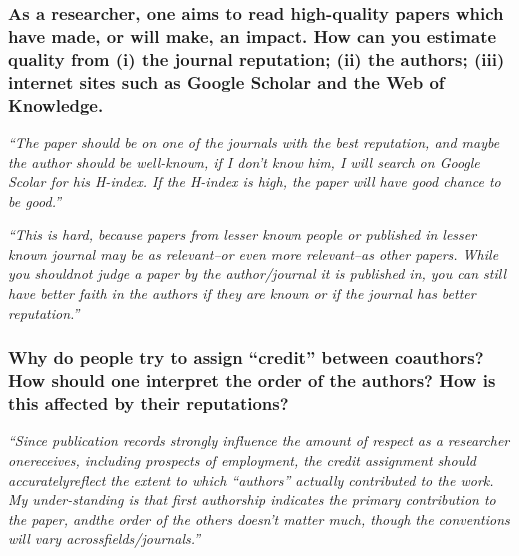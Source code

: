 \documentclass[12pt]{beamer}
\newcommand\ans[1]{{\it ``#1''}}
\begin{document}
\begin{frame} %
  \frametitle{As a researcher, one aims to read high-quality papers which have made, or will make, an impact. How can you estimate quality from (i) the journal reputation; (ii) the authors; (iii) internet sites such as Google Scholar and the Web of Knowledge.}


 \ans{The paper should be on one of the journals with the best reputation, and maybe the author should be well-known, if I don’t know him, I will search on Google Scolar for his H-index.  If the H-index is high, the paper will have good chance to be good.}

 \ans{This is hard,  because papers from lesser known people or published in lesser known journal may be as relevant--or even more relevant--as other papers.  While you shouldnot judge a paper by the author/journal it is published in, you can still have better faith in the authors if they are known or if the journal has better reputation.}
 





%
%


\end{frame} \begin{frame} %
  \frametitle{Why do people try to assign ``credit'' between coauthors? How should one interpret the order of the authors? How is this affected by their reputations?}

  \ans{Since publication records strongly influence the amount of respect as a researcher onereceives, including prospects of employment, the credit assignment should accuratelyreflect  the  extent  to  which  ``authors''  actually  contributed  to  the  work.   My  under-standing is that first authorship indicates the primary contribution to the paper, andthe order of the others doesn’t matter much, though the conventions will vary acrossfields/journals.}


\end{frame}
\end{document}
